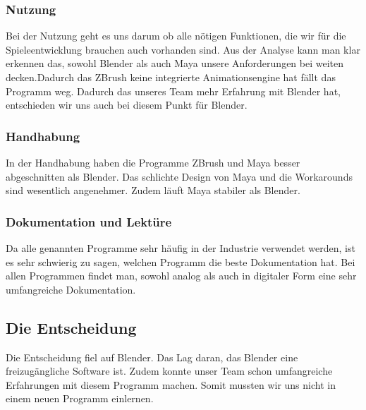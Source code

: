\subsubsection{Nutzung}
Bei der Nutzung geht es uns darum ob alle nötigen Funktionen, die wir für die Spieleentwicklung brauchen auch vorhanden sind. Aus der Analyse kann man klar erkennen das, sowohl Blender als auch Maya unsere Anforderungen bei weiten decken.Dadurch das ZBrush keine integrierte Animationsengine hat fällt das Programm weg. Dadurch das unseres Team mehr Erfahrung mit Blender hat, entschieden wir uns auch bei diesem Punkt für Blender.

\subsubsection{Handhabung}
In der Handhabung haben die Programme ZBrush und Maya besser abgeschnitten als Blender. Das schlichte Design von Maya und die Workarounds  sind wesentlich angenehmer. Zudem läuft Maya stabiler als Blender.

\subsubsection{Dokumentation und Lektüre}
Da alle genannten Programme sehr häufig in der Industrie verwendet werden, ist es sehr schwierig zu sagen, welchen Programm die beste Dokumentation hat. Bei allen Programmen findet man, sowohl analog als auch in digitaler Form eine sehr umfangreiche Dokumentation.

\subsection{Die Entscheidung}
Die Entscheidung fiel auf Blender. Das Lag daran, das Blender eine freizugängliche Software ist. Zudem konnte unser Team schon umfangreiche Erfahrungen mit diesem Programm machen. Somit mussten wir uns nicht in einem neuen Programm einlernen.